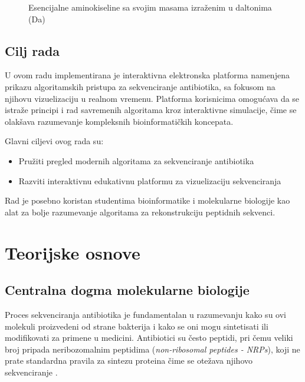 \documentclass[12pt,oneside]{memoir}
\begin{document}
\begin{figure}[h]
  \centering
  
  \caption{Esencijalne aminokiseline sa svojim masama izraženim u daltonima (Da)}
  \label{fig:aminokiseline}
\end{figure}

\section{Cilj rada}
U ovom radu implementirana je interaktivna elektronska platforma namenjena prikazu algoritamskih pristupa za sekvenciranje antibiotika, sa fokusom na njihovu vizuelizaciju u realnom vremenu. Platforma korisnicima omogućava da se istraže principi i rad savremenih algoritama kroz interaktivne simulacije, čime se olakšava razumevanje kompleksnih bioinformatičkih koncepata.

Glavni ciljevi ovog rada su:
\begin{itemize}
    \item Pružiti pregled modernih algoritama za sekvenciranje antibiotika
    \item Razviti interaktivnu edukativnu platformu za vizuelizaciju sekvenciranja
\end{itemize}

Rad je posebno koristan studentima bioinformatike i molekularne biologije kao alat za bolje razumevanje algoritama za rekonstrukciju peptidnih sekvenci.

\chapter{Teorijske osnove}

\section{Centralna dogma molekularne biologije}
Proces sekvenciranja antibiotika je fundamentalan u razumevanju kako su ovi molekuli proizvedeni od strane bakterija i kako se oni mogu sintetisati ili modifikovati za primene u medicini. Antibiotici su često peptidi, pri čemu veliki broj pripada neribozomalnim peptidima (\emph{non-ribosomal peptides - NRPs}), koji ne prate standardna pravila za sintezu proteina čime se otežava njihovo sekvenciranje \cite{online_lecture, online_book}.
\end{document}
